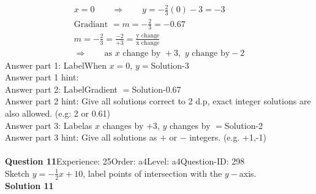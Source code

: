 \documentclass{article}
\begin{document}
\\[-35pt]\begin{align*}
&x=0\qquad\Rightarrow\qquad y=-\displaystyle\frac{2}{3}(0)-3=-3&\\[2pt]
&\text{Gradiant}\,\,=m=-\displaystyle\frac{2}{3}=-0.67&\\[2pt]
&m=-\displaystyle\frac{2}{3}=\displaystyle\frac{-2}{+3}=\displaystyle\frac{\text{y change}}{\text{x change}}&\\[2pt]
& \Rightarrow\qquad \text{as}\,\, x \,\,\text{change by } +3,\,\, y\,\, \text{change by} -2 &
\end{align*}
Answer part 1: \hspace{10pt}Label\hspace{10pt}When $x=0$, $y=$\hspace{10pt}Solution\hspace{10pt}-3\\
Answer part 1 hint: \hspace{15pt}\\
Answer part 2: \hspace{10pt}Label\hspace{10pt}Gradient $=$\hspace{10pt}Solution\hspace{10pt}-0.67\\
Answer part 2 hint: \hspace{15pt}Give all solutions correct to 2 d.p, exact integer solutions are also allowed. (e.g: 2 or 0.61)\\
Answer part 3: \hspace{10pt}Label\hspace{10pt}as $x$ changes by $+3$, $y$ changes by $=$\hspace{10pt}Solution\hspace{10pt}-2\\
Answer part 3 hint: \hspace{15pt}Give all solutions as $+$ or $-$ integers. (e.g. +1,-1)\\
\\[4pt]
\noindent\textbf{Question 11}\hspace{20pt}Experience: 25\hspace{20pt}Order: a4\hspace{20pt}Level: a4\hspace{20pt}Question-ID: 298\\[2pt]
Sketch $y=-\displaystyle\frac{1}{2}x+10$, label points of intersection with the $y-$axis.\\[4pt]
\noindent\textbf{Solution 11}\\[2pt]
\end{document}
